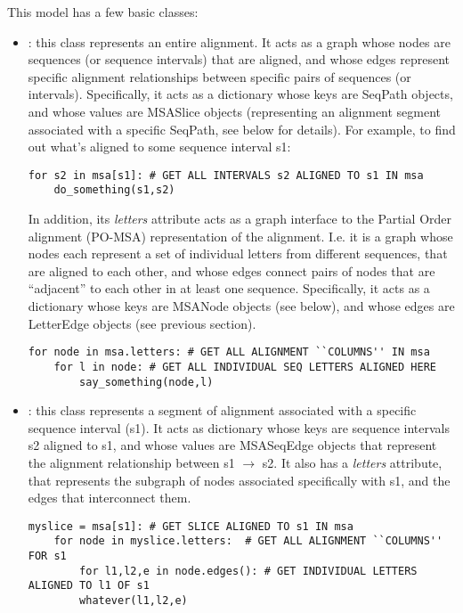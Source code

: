 \documentclass{howto}
\begin{document}
This model has a few basic classes:
\begin{itemize}
\item    
{}: this class represents an entire alignment.  It acts as a graph whose
nodes are sequences (or sequence intervals) that are aligned, and whose edges 
represent specific alignment relationships between specific pairs of sequences 
(or intervals).  Specifically, it acts as a dictionary whose keys are SeqPath
objects, and whose values are MSASlice objects (representing an alignment segment
associated with a specific SeqPath, see below for details).  For example, to find
out what's aligned to some sequence interval s1:
\begin{verbatim}
for s2 in msa[s1]: # GET ALL INTERVALS s2 ALIGNED TO s1 IN msa
    do_something(s1,s2)
\end{verbatim}

In addition, its {\em letters} attribute acts as a graph interface
to the Partial Order alignment (PO-MSA) representation of the alignment.  I.e.
it is a graph whose nodes each represent a set of individual letters from 
different sequences, that are aligned to each other, and whose edges connect
pairs of nodes that are ``adjacent'' to each other in at least one sequence.
Specifically, it acts as a dictionary whose keys are MSANode objects (see below),
and whose edges are LetterEdge objects (see previous section).
\begin{verbatim}
for node in msa.letters: # GET ALL ALIGNMENT ``COLUMNS'' IN msa
    for l in node: # GET ALL INDIVIDUAL SEQ LETTERS ALIGNED HERE
        say_something(node,l)
\end{verbatim}


\item    
{}: this class represents a segment of alignment associated with
a specific sequence interval (s1).  It acts as dictionary whose keys are sequence
intervals s2 aligned to s1, and whose values are MSASeqEdge objects
that represent the alignment relationship between s1 $\rightarrow$ s2.  It also 
has a {\em letters} attribute, that represents the subgraph of nodes
associated specifically with s1, and the edges that interconnect them.

\begin{verbatim}
myslice = msa[s1]: # GET SLICE ALIGNED TO s1 IN msa
    for node in myslice.letters:  # GET ALL ALIGNMENT ``COLUMNS'' FOR s1
        for l1,l2,e in node.edges(): # GET INDIVIDUAL LETTERS ALIGNED TO l1 OF s1
	    whatever(l1,l2,e)
\end{verbatim}


\end{itemize}
\end{document}

